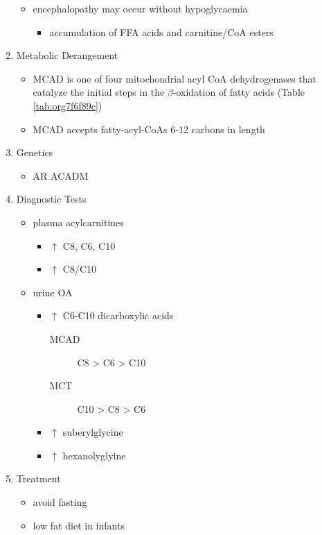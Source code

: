 \documentclass[12pt]{scrartcl}
\begin{document}
\begin{enumerate}
\begin{itemize}
\item encephalopathy may occur without hypoglycaemia
\begin{itemize}
\item accumulation of FFA acids and carnitine/CoA esters
\end{itemize}
\end{itemize}
\item Metabolic Derangement
\label{sec:org9ea84e7}
\begin{itemize}
\item MCAD is one of four mitochondrial acyl CoA dehydrogenases that
catalyze the initial steps in the \(\beta\)-oxidation of fatty acids
(Table \ref{tab:org7f6f89c})
\item MCAD accepts fatty-acyl-CoAs 6-12 carbons in length
\end{itemize}

\item Genetics
\label{sec:org5816c06}
\begin{itemize}
\item AR ACADM
\end{itemize}
\item Diagnostic Tests
\label{sec:org2253de4}
\begin{itemize}
\item plasma acylcarnitines
\begin{itemize}
\item \(\uparrow\) C8, C6, C10
\item \(\uparrow\) C8/C10
\end{itemize}
\item urine OA
\begin{itemize}
\item \(\uparrow\) C6-C10 dicarboxylic acids
\begin{description}
\item[{MCAD}] C8 > C6 > C10
\item[{MCT}] C10 > C8 > C6
\end{description}
\item \(\uparrow\) suberylglycine
\item \(\uparrow\) hexanolyglyine
\end{itemize}
\end{itemize}

\item Treatment
\label{sec:orgb7811cd}
\begin{itemize}
\item avoid fasting
\item low fat diet in infants
\end{itemize}
\end{enumerate}
\end{document}
